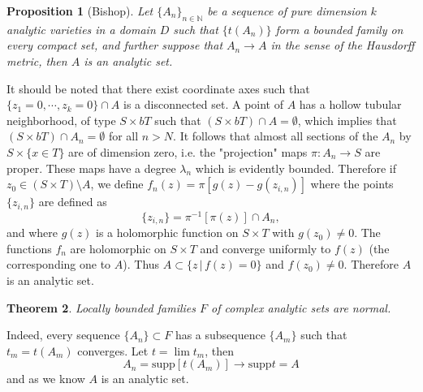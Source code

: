 \documentclass[12pt,twoside,a4paper]{report}
\newtheorem{theorem}{Theorem}[section]
\newtheorem{prop}[theorem]{Proposition}
\begin{document}
\begin{prop}[Bishop]
Let $\{A_n\}_{n\in\mathbb{N}}$ be a sequence of pure dimension $k$ analytic varieties in a domain $D$ such that $\{t(A_n)\}$ form a bounded family on every compact set, and further suppose that $A_n\rightarrow A$ in the sense of the Hausdorff metric, then $A$ is an analytic set.
\end{prop}

It should be noted that there exist coordinate axes such that $\{z_1=0,\cdots,z_k=0\}\cap A$ is a disconnected set. A point of $A$ has a hollow tubular neighborhood, of type $S\times bT$ such that $(S\times bT)\cap A=\emptyset$, which implies that $(S\times bT)\cap A_n=\emptyset$ for all $n>N$. It follows that almost all sections of the $A_n$ by $S\times\{x\in T\}$ are of dimension zero, i.e. the "projection" maps $\pi:A_n\rightarrow S$ are proper. These maps have a degree $\lambda_n$ which is evidently bounded. Therefore if $z_0\in(S\times T)\setminus A$, we define $f_n(z)=\pi[g(z)-g(z_{i,n})]$ where the points $\{z_{i,n}\}$ are defined as
\[
\{z_{i,n}\}=\pi^{-1}[\pi(z)]\cap A_n,
\]
and where $g(z)$ is a holomorphic function on $S\times T$ with $g(z_0)\neq0$. The functions $f_n$ are holomorphic on $S\times T$ and converge uniformly to $f(z)$ (the corresponding one to $A$). Thus $A\subset\{z\,|\,f(z)=0\}$ and $f(z_0)\neq0$. Therefore $A$ is an analytic set.

\begin{theorem}
Locally bounded families $F$ of complex analytic sets are normal.
\end{theorem}

Indeed, every sequence $\{A_n\}\subset F$ has a subsequence $\{A_m\}$ such that $t_m=t(A_m)$ converges. Let $t=\lim t_m$, then
\[
    A_n=\mathrm{supp}[t(A_m)]\rightarrow\mathrm{supp}t=A
\]
and as we know $A$ is an analytic set.
\end{document}
